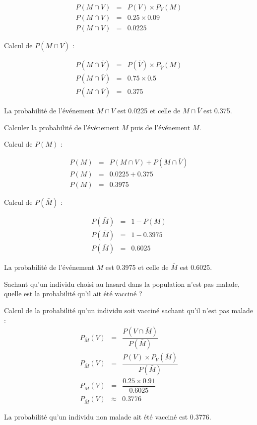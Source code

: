 \begin{questions}
\begin{solution}
		\begin{eqnarray*}
			P(M \cap V) &=& P(V) \times P_V(M) \\
			P(M \cap V) &=& \num{0.25} \times \num{0.09} \\
			P(M \cap V) &=& \num{0.0225}
		\end{eqnarray*}
	
		Calcul de $P(M \cap \bar{V})$ :
		
		\begin{eqnarray*}
			P(M \cap \bar{V}) &=& P(\bar{V}) \times P_{\bar{V}}(M) \\
			P(M \cap \bar{V}) &=& \num{0.75} \times \num{0.5} \\
			P(M \cap \bar{V}) &=& \num{0.375}
		\end{eqnarray*}
	
	La probabilité de l'événement $M \cap V$ est \num{0.0225} et celle de $M \cap \bar{V}$ est \num{0.375}.
	\end{solution}
	
	\question[2] Calculer la probabilité de l'événement $M$ puis de l'événement $\bar{M}$.
	\begin{solution}
		Calcul de $P(M) $ :
		
		\begin{eqnarray*}
			P(M) &=& P(M \cap V) + P(M \cap \bar{V}) \\
			P(M) &=& \num{0.0225} + \num{0.375} \\
			P(M) &=& \num{0.3975}
		\end{eqnarray*}
	
		Calcul de $P(\bar{M}) $ :
		
		\begin{eqnarray*}
			P(\bar{M}) &=& 1 - P(M) \\
			P(\bar{M}) &=& 1 -  \num{0.3975} \\
			P(\bar{M}) &=& \num{0.6025}
		\end{eqnarray*}
	
		La probabilité de l'événement $M$ est \num{0.3975} et celle de $\bar{M}$ est \num{0.6025}.
	\end{solution}
	
	\question[2] Sachant qu'un individu choisi au hasard dans la population n'est pas malade, quelle est la probabilité qu'il ait été vacciné ?
	\begin{solution}
		Calcul de la probabilité qu'un individu soit vacciné sachant qu'il n'est pas malade :
		\begin{eqnarray*}
			P_{\bar{M}}(V) &=& \dfrac{P(V \cap \bar{M})}{P(\bar{M})}\\
			P_{\bar{M}}(V) &=& \dfrac{P(V) \times P_V(\bar{M})}{P(\bar{M})}\\
			P_{\bar{M}}(V) &=& \dfrac{\num{0.25} \times \num{0.91}}{\num{0.6025}}\\
			P_{\bar{M}}(V) &\approx& \num{0.3776}
		\end{eqnarray*}
	
	La probabilité qu'un individu non malade ait été vacciné est \num{0.3776}.
	\end{solution}
\end{questions}  